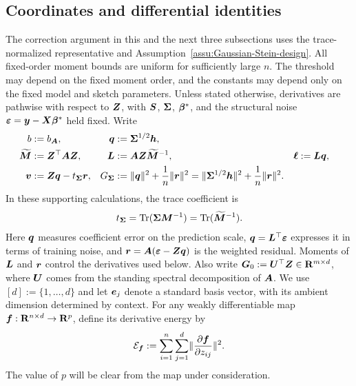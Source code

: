 \documentclass{article}
\theoremstyle{plain} %
\theoremstyle{definition} %
\theoremstyle{definition} %
\begin{document}
\subsection{Coordinates and differential identities}
\label{app:balanced-transfer-setup}
The correction argument in this and the next three subsections uses the
trace-normalized representative and
Assumption~\ref{assu:Gaussian-Stein-design}. All fixed-order moment bounds
are uniform for sufficiently large $n$. The threshold may depend on the
fixed moment order, and the constants may depend only on the fixed model
and sketch parameters. Unless stated otherwise, derivatives are
pathwise with respect to $\boldsymbol{Z}$, with $\boldsymbol{S}$, $\boldsymbol{\Sigma}$, $\boldsymbol{\beta}^*$, and
the structural noise ${\boldsymbol{\varepsilon} }=\boldsymbol{y}-\boldsymbol{X}\boldsymbol{\beta}^*$ held fixed. Write
\begin{align*}
    b&:=b_{\boldsymbol{A}},
    & \boldsymbol{q}&:=\boldsymbol{\Sigma}^{1/2}\boldsymbol{h},\\
    \widetilde{\boldsymbol{M}}&:=\boldsymbol{Z}^\top\boldsymbol{A}\boldsymbol{Z},
    & \boldsymbol{L}&:=\boldsymbol{A}\boldsymbol{Z}\widetilde{\boldsymbol{M}}^{-1},
    & \boldsymbol{\ell}&:=\boldsymbol{L}\boldsymbol{q},\\
    \boldsymbol{v}&:=\boldsymbol{Z}\boldsymbol{q}-t_{\boldsymbol{\Sigma}}\boldsymbol{r},
    & G_{\boldsymbol{\Sigma}}&:=\lVert\boldsymbol{q}\rVert^2+\frac{1}{n}\lVert\boldsymbol{r}\rVert^2
      =\lVert\boldsymbol{\Sigma}^{1/2}\boldsymbol{h}\rVert^2+\frac{1}{n}\lVert\boldsymbol{r}\rVert^2.
\end{align*}
In these supporting calculations, the trace coefficient is
\begin{align*}
    t_{\boldsymbol{\Sigma}}=\operatorname{Tr}(\boldsymbol{\Sigma}\boldsymbol{M}^{-1})
       =\operatorname{Tr}(\widetilde{\boldsymbol{M}}^{-1}).
\end{align*}
Here $\boldsymbol{q}$ measures coefficient error on the prediction scale,
$\boldsymbol{q}=\boldsymbol{L}^\top{\boldsymbol{\varepsilon} }$ expresses it in terms of training noise, and
$\boldsymbol{r}=\boldsymbol{A}({\boldsymbol{\varepsilon} }-\boldsymbol{Z}\boldsymbol{q})$ is the weighted residual. Moments of $\boldsymbol{L}$
and $\boldsymbol{r}$ control the derivatives used below. Also write
$\boldsymbol{G}_0:=\boldsymbol{U}^\top\boldsymbol{Z}\in{\mathbf{R}}^{m\times d}$, where $\boldsymbol{U}$ comes
from the standing spectral decomposition of $\boldsymbol{A}$. We use
$[d]:=\{1,\ldots,d\}$ and let $\boldsymbol{e}_j$ denote a standard basis vector,
with its ambient dimension determined by context.
For any weakly differentiable map
$\boldsymbol{f}:{\mathbf{R}}^{n\times d}\to{\mathbf{R}}^p$, define its derivative energy by
\begin{equation*}
    {\mathcal E}_{\boldsymbol{f}}:=\sum_{i=1}^n\sum_{j=1}^d
    \lVert\pdv{\boldsymbol{f}}{z_{ij}}\rVert^2.
\end{equation*}
The value of $p$ will be clear from the map under consideration.
\end{document}
